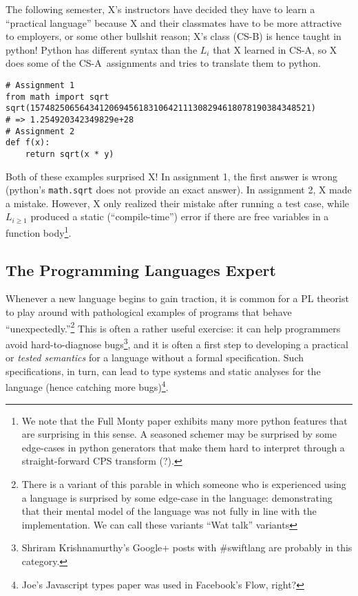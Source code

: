 \documentclass[12pt]{article}
\newcommand{\csa}{\textsc{CS-A}}
\newcommand{\csb}{\textsc{CS-B}}
\begin{document}
The following semester, X's instructors have decided they have to learn a
``practical language'' because X and their classmates have to be more attractive
to employers, or some other bullshit reason; X's class (\csb) is hence taught in
python! Python has different syntax than the $L_i$ that X learned in \csa, so X
does some of the \csa~assignments and tries to translate them to python.

\begin{verbatim}
# Assignment 1
from math import sqrt
sqrt(157482506564341206945618310642111308294618078190384348521)
# => 1.254920342349829e+28
# Assignment 2
def f(x):
    return sqrt(x * y)
\end{verbatim}

Both of these examples surprised X! In assignment 1, the first answer is wrong
(python's \verb|math.sqrt| does not provide an exact answer). In assignment 2, X
made a mistake. However, X only realized their mistake after running a test
case, while $L_{i \geq 1}$ produced a static (``compile-time'') error if there
are free variables in a function body\footnote{We note that the Full Monty paper
exhibits many more python features that are surprising in this sense. A
seasoned schemer may be surprised by some edge-cases in python generators that
make them hard to interpret through a straight-forward CPS transform (?).}.


\subsection{The Programming Languages Expert}

Whenever a new language begins to gain traction, it is common for a PL theorist
to play around with pathological examples of programs that behave
``unexpectedly.''\footnote{There is a variant of this parable in which someone
  who is experienced using a language is surprised by some edge-case in the
  language: demonstrating that their mental model of the language was not fully
  in line with the implementation. We can call these variants ``Wat talk''
  variants} 
This is often a rather useful exercise: it can help programmers avoid
hard-to-diagnose bugs\footnote{Shriram Krishnamurthy's Google+ posts
with \#swiftlang are probably in this category.}, and it is often a first step to
developing a practical or \emph{tested semantics} for a language without a
formal specification. Such specifications, in turn, can lead to type systems and
static analyses for the language (hence catching more bugs)\footnote{Joe's
Javascript types paper was used in Facebook's Flow, right?}.
\end{document}

